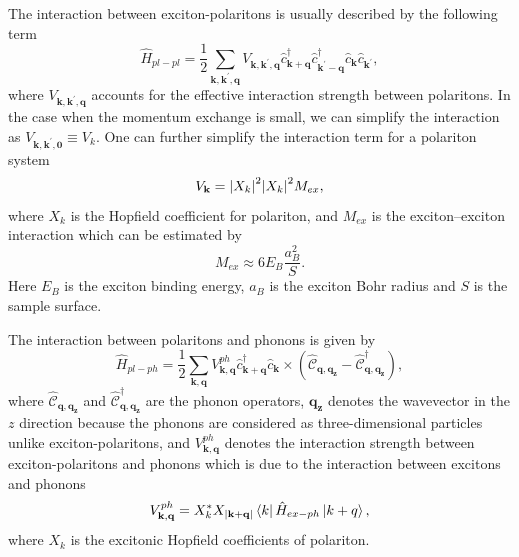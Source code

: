 The interaction between exciton-polaritons is usually described by the following term
%
\begin{equation}
    \hat{H}_{pl-pl} = \frac{1}{2} \sum_{\mathbf{k,k^\prime ,q}} V_\mathbf{k,k^\prime,q} \hat{c}^\dagger_\mathbf{k+q}\hat{c}^\dagger_\mathbf{k^\prime -q}\hat{c}_\mathbf{k}\hat{c}_\mathbf{k^\prime},
    \label{eq:Ch1_pl-pl}
\end{equation}
%
where $V_\mathbf{k,k^\prime,q}$ accounts for the effective interaction strength between polaritons.
In the case when the momentum exchange is small, we can simplify the interaction as $V_\mathbf{k,k^\prime,0}\equiv V_{k}$.
One can further simplify the interaction term for a polariton system
\begin{equation}
    \label{eq:Ch1_pl-pl_detail}
    V_\mathbf{k} = \abs{X_k}^2\abs{X_k}^2 M_{ex},
\end{equation}
where $X_k$ is the Hopfield coefficient for polariton, and $M_{ex}$ is the exciton--exciton interaction which can be estimated by~\cite{Tassone:1999aa}
\begin{equation}
    \label{eq:Ch1_ex_ex}
    M_{ex} \approx 6 E_B \frac{a_B^2}{S}.
\end{equation}
Here $E_B$ is the exciton binding energy, $a_B$ is the exciton Bohr radius and $S$ is the sample surface.

The interaction between polaritons and phonons is given by~\cite{Deng:2010aa,Kavokin:2007aa}
%
\begin{equation}
    \hat{H}_{pl-ph} = \frac{1}{2} \sum_{\mathbf{k,q}}  V_{\mathbf{k,q}}^{ph} \hat{c}^\dagger_{\mathbf{k+q}}\hat{c}_\mathbf{k}\times \left( \hat{\mathscr{C}}_\mathbf{q,q_z} - \hat{\mathscr{C}}^\dagger_\mathbf{q,q_z} \right),
    \label{eq:Ch1_pl-ph}
\end{equation}
%
where $\hat{\mathscr{C}}_\mathbf{q,q_z}$ and $\hat{\mathscr{C}}_\mathbf{q,q_z}^\dagger$ are the phonon operators, $\mathbf{q_z}$ denotes the wavevector in the $z$ direction because the phonons are considered as three-dimensional particles unlike exciton-polaritons, and $V^{ph}_{\mathbf{k,q}}$ denotes the interaction strength between exciton-polaritons and phonons which is due to the interaction between excitons and phonons
\begin{equation}
    \label{eq:Ch1_ex_ph}
    V_{\mathbf{k,q}}^{ph}  = X_k^* X_\abs{\mathbf{k}+\mathbf{q}} \bra{k} \hat{H}_{ex-ph} \ket{k+q},
\end{equation}
where $X_k$ is the excitonic Hopfield coefficients of polariton.

